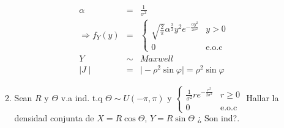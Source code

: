 \begin{enumerate}
\begin{enumerate}
\begin{eqnarray*}
 \alpha &=& \frac{1}{\sigma^2}\\
 \Rightarrow f_{Y} \left(y \right)&=& \begin{cases} 
 \sqrt{ \frac{2}{\pi} } \alpha^{ \frac{3}{2}} y^2 e^{- \frac{\alpha y^2}{ 2\sigma^2} } & y>0\\
0 & \textrm{e.o.c}
 \end{cases}\\
 Y &\sim & Maxwell\\
 \mid J  \mid &=& \mid - \rho^2 \sin \varphi \mid = \rho^2 \sin \varphi
\end{eqnarray*}
 \item  Sean $R$ y $\Theta$ v.a ind. t.q $\Theta \sim U \left( -\pi , \pi \right)$ y
 $ \begin{cases} 
 \frac{1}{\sigma^2}r e^{- \frac{r^2}{2\sigma^2} } & r\geq 0\\
 0 & \textrm{e.o.c}
 \end{cases} 
 $
 Hallar la densidad conjunta de $X = R \cos \Theta$, $Y=R \sin \Theta$ ¿ Son ind?.
 

\end{enumerate}
\end{enumerate}

